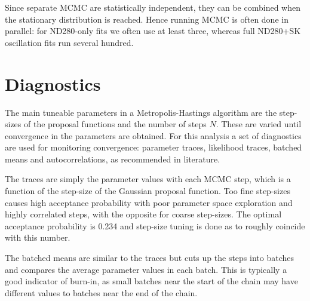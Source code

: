Since separate MCMC are statistically independent, they can be combined when the stationary distribution is reached. Hence running MCMC is often done in parallel: for ND280-only fits we often use at least three, whereas full ND280+SK oscillation fits run several hundred.

\section{Diagnostics}
The main tuneable parameters in a Metropolis-Hastings algorithm are the step-sizes of the proposal functions and the number of steps $N$. These are varied until convergence in the parameters are obtained. For this analysis a set of diagnostics are used for monitoring convergence: parameter traces, likelihood traces, batched means and autocorrelations, as recommended in literature\cite{mcmc_handbook}.

The traces are simply the parameter values with each MCMC step, which is a function of the step-size of the Gaussian proposal function. Too fine step-sizes causes high acceptance probability with poor parameter space exploration and highly correlated steps, with the opposite for coarse step-sizes. The optimal acceptance probability is 0.234\cite{step_prop,mcmc_handbook} and step-size tuning is done as to roughly coincide with this number.

The batched means are similar to the traces but cuts up the steps into batches and compares the average parameter values in each batch. This is typically a good indicator of burn-in, as small batches near the start of the chain may have different values to batches near the end of the chain.

